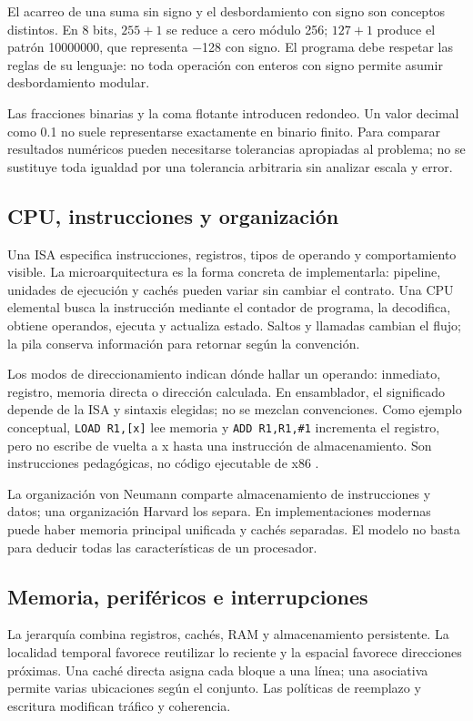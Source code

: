 El acarreo de una suma sin signo y el desbordamiento con signo son conceptos distintos. En 8 bits, $255+1$ se reduce a cero módulo 256; $127+1$ produce el patrón 10000000, que representa −128 con signo. El programa debe respetar las reglas de su lenguaje: no toda operación con enteros con signo permite asumir desbordamiento modular.

Las fracciones binarias y la coma flotante introducen redondeo. Un valor decimal como 0.1 no suele representarse exactamente en binario finito. Para comparar resultados numéricos pueden necesitarse tolerancias apropiadas al problema; no se sustituye toda igualdad por una tolerancia arbitraria sin analizar escala y error.

\subsection{CPU, instrucciones y organización}
Una ISA especifica instrucciones, registros, tipos de operando y comportamiento visible. La microarquitectura es la forma concreta de implementarla: pipeline, unidades de ejecución y cachés pueden variar sin cambiar el contrato. Una CPU elemental busca la instrucción mediante el contador de programa, la decodifica, obtiene operandos, ejecuta y actualiza estado. Saltos y llamadas cambian el flujo; la pila conserva información para retornar según la convención.

Los modos de direccionamiento indican dónde hallar un operando: inmediato, registro, memoria directa o dirección calculada. En ensamblador, el significado depende de la ISA y sintaxis elegidas; no se mezclan convenciones. Como ejemplo conceptual, \texttt{LOAD R1,[x]} lee memoria y \texttt{ADD R1,R1,\#1} incrementa el registro, pero no escribe de vuelta a x hasta una instrucción de almacenamiento. Son instrucciones pedagógicas, no código ejecutable de x86 \cite[volumen 1: Basic Execution Environment]{intel}.

La organización von Neumann comparte almacenamiento de instrucciones y datos; una organización Harvard los separa. En implementaciones modernas puede haber memoria principal unificada y cachés separadas. El modelo no basta para deducir todas las características de un procesador.

\subsection{Memoria, periféricos e interrupciones}
La jerarquía combina registros, cachés, RAM y almacenamiento persistente. La localidad temporal favorece reutilizar lo reciente y la espacial favorece direcciones próximas. Una caché directa asigna cada bloque a una línea; una asociativa permite varias ubicaciones según el conjunto. Las políticas de reemplazo y escritura modifican tráfico y coherencia.

